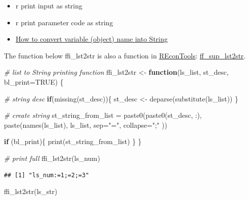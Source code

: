 \documentclass[
]{book}
\newenvironment{Shaded}{\begin{snugshade}}{\end{snugshade}}
\newcommand{\AttributeTok}[1]{\textcolor[rgb]{0.77,0.63,0.00}{#1}}
\newcommand{\CommentTok}[1]{\textcolor[rgb]{0.56,0.35,0.01}{\textit{#1}}}
\newcommand{\ConstantTok}[1]{\textcolor[rgb]{0.00,0.00,0.00}{#1}}
\newcommand{\ControlFlowTok}[1]{\textcolor[rgb]{0.13,0.29,0.53}{\textbf{#1}}}
\newcommand{\FunctionTok}[1]{\textcolor[rgb]{0.00,0.00,0.00}{#1}}
\newcommand{\NormalTok}[1]{#1}
\newcommand{\OtherTok}[1]{\textcolor[rgb]{0.56,0.35,0.01}{#1}}
\newcommand{\StringTok}[1]{\textcolor[rgb]{0.31,0.60,0.02}{#1}}
\providecommand{\tightlist}{%
  \setlength{\itemsep}{0pt}\setlength{\parskip}{0pt}}
\begin{document}
\begin{itemize}
\tightlist
\item
  r print input as string
\item
  r print parameter code as string
\item
  \href{https://stackoverflow.com/a/14577878/8280804}{How to convert variable (object) name into String}
\end{itemize}

The function below ffi\_lst2str is also a function in \href{https://fanwangecon.github.io/REconTools/index.html}{REconTools}: \href{https://fanwangecon.github.io/REconTools/reference/ff_sup_lst2str.html}{ff\_sup\_lst2str}.

\begin{Shaded}
\begin{Highlighting}[]
\CommentTok{\# list to String printing function}
\NormalTok{ffi\_lst2str }\OtherTok{\textless{}{-}} \ControlFlowTok{function}\NormalTok{(ls\_list, st\_desc, }\AttributeTok{bl\_print=}\ConstantTok{TRUE}\NormalTok{) \{}

  \CommentTok{\# string desc}
  \ControlFlowTok{if}\NormalTok{(}\FunctionTok{missing}\NormalTok{(st\_desc))\{}
\NormalTok{    st\_desc }\OtherTok{\textless{}{-}} \FunctionTok{deparse}\NormalTok{(}\FunctionTok{substitute}\NormalTok{(ls\_list))}
\NormalTok{  \}}

  \CommentTok{\# create string}
\NormalTok{  st\_string\_from\_list }\OtherTok{=} \FunctionTok{paste0}\NormalTok{(}\FunctionTok{paste0}\NormalTok{(st\_desc, }\StringTok{\textquotesingle{}:\textquotesingle{}}\NormalTok{),}
                               \FunctionTok{paste}\NormalTok{(}\FunctionTok{names}\NormalTok{(ls\_list), ls\_list, }\AttributeTok{sep=}\StringTok{"="}\NormalTok{, }\AttributeTok{collapse=}\StringTok{";"}\NormalTok{ ))}

  \ControlFlowTok{if}\NormalTok{ (bl\_print)\{}
    \FunctionTok{print}\NormalTok{(st\_string\_from\_list)}
\NormalTok{  \}}
\NormalTok{\}}

\CommentTok{\# print full}
\FunctionTok{ffi\_lst2str}\NormalTok{(ls\_num)}
\end{Highlighting}
\end{Shaded}

\begin{verbatim}
## [1] "ls_num:=1;=2;=3"
\end{verbatim}

\begin{Shaded}
\begin{Highlighting}[]
\FunctionTok{ffi\_lst2str}\NormalTok{(ls\_str)}
\end{Highlighting}
\end{Shaded}
\end{document}
